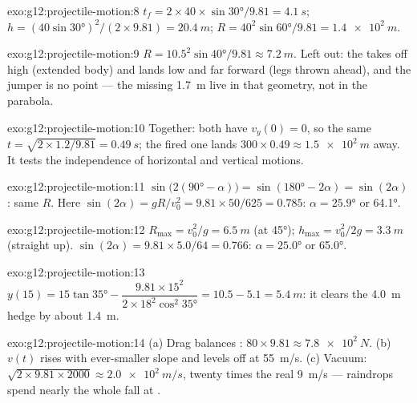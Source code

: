 \begin{solution}{exo:g12:projectile-motion:8}
$t_f = 2 \times 40 \times \sin\ang{30}/9.81 = \qty{4.1}{s}$;
$h = (40\sin\ang{30})^2/(2 \times 9.81) = \qty{20.4}{m}$;
$R = 40^2 \sin\ang{60}/9.81 = \qty{1.4e2}{m}$.
\end{solution}

\begin{solution}{exo:g12:projectile-motion:9}
$R = 10.5^2\sin\ang{40}/9.81 \approx \qty{7.2}{m}$. Left out: the
 takes off high (extended body) and lands low and far
forward (legs thrown ahead), and the jumper is no point --- the
missing \qty{1.7}{m} live in that geometry, not in the parabola.
\end{solution}

\begin{solution}{exo:g12:projectile-motion:10}
Together: both have $v_y(0) = 0$, so the same
$t = \sqrt{2 \times 1.2/9.81} = \qty{0.49}{s}$; the fired one lands
$300 \times 0.49 \approx \qty{1.5e2}{m}$ away. It tests the
independence of horizontal and vertical motions.
\end{solution}

\begin{solution}{exo:g12:projectile-motion:11}
$\sin\bigl(2(\ang{90}-\alpha)\bigr) = \sin(\ang{180}-2\alpha) =
\sin(2\alpha)$: same $R$. Here $\sin(2\alpha) = gR/v_0^2 =
9.81 \times 50/625 = 0.785$: $\alpha = \ang{25.9}$ or \ang{64.1}.
\end{solution}

\begin{solution}{exo:g12:projectile-motion:12}
$R_{\max} = v_0^2/g = \qty{6.5}{m}$ (at \ang{45});
$h_{\max} = v_0^2/2g = \qty{3.3}{m}$ (straight up).
$\sin(2\alpha) = 9.81 \times 5.0/64 = 0.766$: $\alpha = \ang{25.0}$
or \ang{65.0}.
\end{solution}

\begin{solution}{exo:g12:projectile-motion:13}
$y(15) = 15\tan\ang{35} - \dfrac{9.81 \times 15^2}
{2 \times 18^2 \cos^2\ang{35}} = 10.5 - 5.1 = \qty{5.4}{m}$:
it clears the \qty{4.0}{m} hedge by about \qty{1.4}{m}.
\end{solution}

\begin{solution}{exo:g12:projectile-motion:14}
(a) Drag balances : $80 \times 9.81 \approx \qty{7.8e2}{N}$.
(b) $v(t)$ rises with ever-smaller slope and levels off at
\qty{55}{m/s}. (c) Vacuum:
$\sqrt{2 \times 9.81 \times 2000} \approx \qty{2.0e2}{m/s}$, twenty
times the real \qty{9}{m/s} --- raindrops spend nearly the whole
fall at .
\end{solution}

